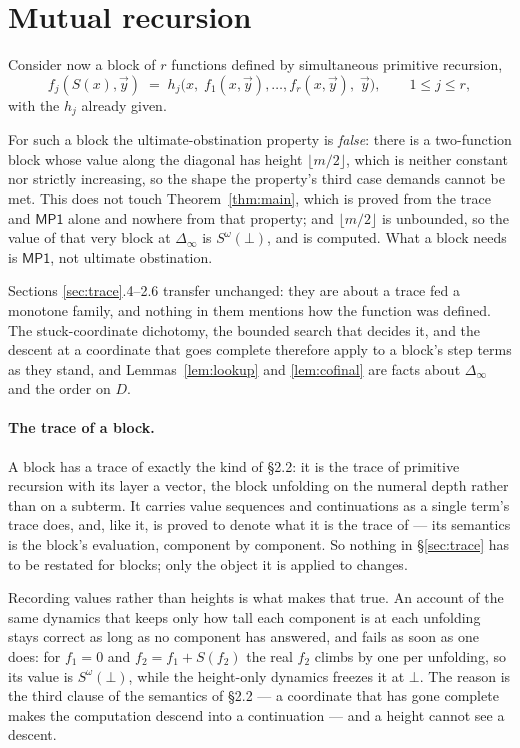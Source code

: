 \documentclass[11pt]{article}
\newcommand{\Sw}{S^{\omega}(\bot)}
\newcommand{\D}{D}
\newcommand{\MP}{\mathsf{MP1}}
\theoremstyle{definition}
\begin{document}
\section{Mutual recursion}
\label{sec:mutual}

Consider now a block of $r$ functions defined by simultaneous primitive
recursion,
\begin{equation}
\label{eq:block}
f_j(S(x),\vec y) \;=\; h_j\bigl(x,\; f_1(x,\vec y),\dots,f_r(x,\vec y),\;
\vec y\bigr), \qquad 1 \le j \le r,
\end{equation}
with the $h_j$ already given.

For such a block the ultimate-obstination property is \emph{false}: there
is a two-function block whose value along the diagonal has height
$\lfloor m/2 \rfloor$, which is neither constant nor strictly increasing,
so the shape the property's third case demands cannot be met. This does
not touch Theorem~\ref{thm:main}, which is proved from the trace and $\MP$
alone and nowhere from that property; and $\lfloor m/2 \rfloor$ is
unbounded, so the value of that very block at $\Delta_\infty$ is $\Sw$,
and is computed. What a block needs is $\MP$, not ultimate obstination.

Sections \ref{sec:trace}.4--2.6 transfer unchanged: they are about a trace
fed a monotone family, and nothing in them mentions how the function was
defined. The stuck-coordinate dichotomy, the bounded search that decides
it, and the descent at a coordinate that goes complete therefore apply to
a block's step terms as they stand, and Lemmas~\ref{lem:lookup} and
\ref{lem:cofinal} are facts about $\Delta_\infty$ and the order on $\D$.

\paragraph{The trace of a block.} A block has a trace of exactly the kind
of \S2.2: it is the trace of primitive recursion with its layer a vector,
the block unfolding on the numeral depth rather than on a subterm. It
carries value sequences and continuations as a single term's trace does,
and, like it, is proved to denote what it is the trace of --- its
semantics is the block's evaluation, component by component. So nothing in
\S\ref{sec:trace} has to be restated for blocks; only the object it is
applied to changes.

Recording values rather than heights is what makes that true. An account
of the same dynamics that keeps only how tall each component is at each
unfolding stays correct as long as no component has answered, and fails as
soon as one does: for $f_1 = 0$ and $f_2 = f_1 + S(f_2)$ the real $f_2$
climbs by one per unfolding, so its value is $\Sw$, while the height-only
dynamics freezes it at $\bot$. The reason is the third clause of the
semantics of \S2.2 --- a coordinate that has gone complete makes the
computation descend into a continuation --- and a height cannot see a
descent.
\end{document}
